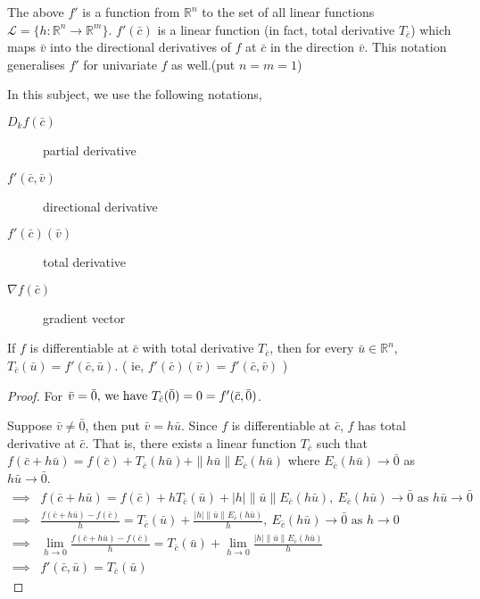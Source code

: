 \begin{note}
The above $f'$ is a function from $\mathbb{R}^n$ to the set of all linear functions \( \mathscr{L} = \{ h : \mathbb{R}^n \to \mathbb{R}^m\} \).
$f'(\bar{c})$ is a linear function (in fact, total derivative $T_{\bar{c}}$) which maps $\bar{v}$ into the directional derivatives of $f$ at $\bar{c}$ in the direction $\bar{v}$.
This notation generalises $f'$ for univariate $f$ as well.(put $n=m=1$)

In this subject, we use the following notations,
\begin{description}
	\item[$D_kf(\bar{c})$] partial derivative
	\item[$f'(\bar{c},\bar{v})$] directional derivative
	\item[$f'(\bar{c})(\bar{v})$] total derivative
	\item[$\nabla{}f(\bar{c})$] gradient vector
\end{description}
\end{note}

\begin{theorem}
If $f$ is differentiable at $\bar{c}$ with total derivative $T_{\bar{c}}$, then for every $\bar{u} \in \mathbb{R}^n$, $T_{\bar{c}}(\bar{u}) = f'(\bar{c},\bar{u})$.
( ie, \( f'(\bar{c})(\bar{v}) = f'(\bar{c},\bar{v}) \) )
\end{theorem}
\begin{proof}
For \( \bar{v} = \bar{0}$, we have $T_{\bar{c}}(\bar{0}) = 0 = f'(\bar{c},\bar{0}) \).

Suppose \( \bar{v} \ne \bar{0} \), then put \( \bar{v} = h\bar{u} \).
Since $f$ is differentiable at $\bar{c}$, $f$ has total derivative at $\bar{c}$.
That is, there exists a linear function $T_{\bar{c}}$ such that \( f(\bar{c}+h\bar{u}) = f(\bar{c}) + T_{\bar{c}}(h\bar{u}) + \|h\bar{u}\|E_{\bar{c}} (h\bar{u}) \) where $E_{\bar{c}}(h\bar{u}) \to \bar{0}$ as $h\bar{u} \to \bar{0}$.
\begin{align*}
	\implies  & f(\bar{c}+h\bar{u}) = f(\bar{c}) + hT_{\bar{c}}(\bar{u}) + |h|\|\bar{u}\|E_{\bar{c}} (h\bar{u}),\ E_{\bar{c}}(h\bar{u}) \to \bar{0} \text{ as } h\bar{u} \to \bar{0} \\
	\implies  & \frac{f(\bar{c}+h\bar{u}) - f(\bar{c})}{h} = T_{\bar{c}}(\bar{u}) + \frac{|h|\|\bar{u}\|E_{\bar{c}}(h\bar{u})}{h},\  E_{\bar{c}}(h\bar{u}) \to \bar{0} \text{ as } h \to 0 \\
	\implies  & \lim_{h \to 0} \frac{f(\bar{c}+h\bar{u}) - f(\bar{c})}{h} = T_{\bar{c}}(\bar{u}) + \lim_{h \to 0} \frac{|h|\|\bar{u}\|E_{\bar{c}}(h\bar{u})}{h} \\
	\implies & f'(\bar{c},\bar{u}) = T_{\bar{c}}(\bar{u})
\end{align*}
\end{proof}

